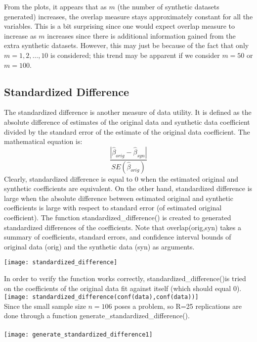 \documentclass[12pt]{article}
\begin{document}
From the plots, it appears that as $m$ (the number of synthetic datasets generated) increases, the overlap measure stays approximately constant for all the variables. This is a bit surprising since one would expect overlap measure to increase as $m$ increases since there is additional information gained from the extra synthetic datasets. However, this may just be because of the fact that only $m=1,2,\dots, 10$ is considered; this trend may be apparent if we consider $m=50$ or $m=100$. 

\subsection*{Standardized Difference}
The standardized difference is another measure of data utility. It is defined as the absolute difference of estimates of the original data and synthetic data coefficient divided by the standard error of the estimate of the original data coefficient. The mathematical equation is:
$$\frac{| \hat{\beta}_{orig} - \hat{\beta}_{syn} |}{SE(\hat{\beta}_{orig})}$$
Clearly, standardized difference is equal to 0 when the estimated original and synthetic coefficients are equivalent. On the other hand, standardized difference is large when the absolute difference between estimated original and synthetic coefficients is large with respect to standard error (of estimated original coefficient).
The function standardized\_difference() is created to generated standardized differences of the coefficients. Note that overlap(orig,syn) takes a summary of coefficients, standard errors, and confidence interval bounds of original data (orig) and the synthetic data (syn) as arguments. \\
\begin{center}
	\texttt{[image: standardized\_difference]}\\
\end{center}
In order to verify the function works correctly, standardized\_difference()is tried on the coefficients of the original data fit against itself (which should equal 0).\\
\texttt{[image: standardized\_difference(conf(data),conf(data))]}\\

Since the small sample size $n=106$ poses a problem, so R=25 replications are done through a function generate\_standardized\_difference(). \\\\
\texttt{[image: generate\_standardized\_difference1]}\\
\end{document}
